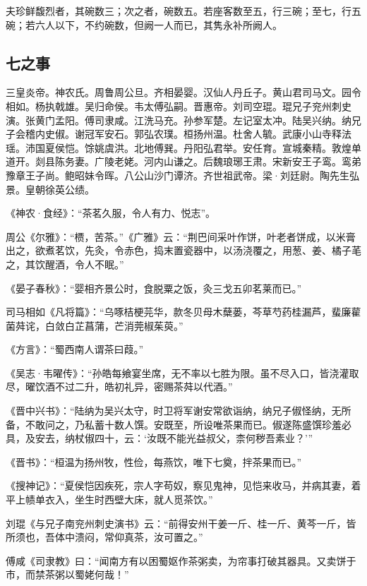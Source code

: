 \documentclass[]{article}
\begin{document}
夫珍鲜馥烈者，其碗数三；次之者，碗数五。若座客数至五，行三碗；至七，行五碗；若六人以下，不约碗数，但阙一人而已，其隽永补所阙人。

\hypertarget{header-n28}{%
\subsection{七之事}\label{header-n28}}

三皇炎帝。神农氏。周鲁周公旦。齐相晏婴。汉仙人丹丘子。黄山君司马文。园令相如。杨执戟雄。吴归命侯。韦太傅弘嗣。晋惠帝。刘司空琨。琨兄子兖州刺史演。张黄门孟阳。傅司隶咸。江洗马充。孙参军楚。左记室太冲。陆吴兴纳。纳兄子会稽内史俶。谢冠军安石。郭弘农璞。桓扬州温。杜舍人毓。武康小山寺释法瑶。沛国夏侯恺。馀姚虞洪。北地傅巽。丹阳弘君举。安任育。宣城秦精。敦煌单道开。剡县陈务妻。广陵老姥。河内山谦之。后魏琅琊王肃。宋新安王子鸾。鸾弟豫章王子尚。鲍昭妹令晖。八公山沙门谭济。齐世祖武帝。梁·刘廷尉。陶先生弘景。皇朝徐英公绩。

《神农·食经》：``茶茗久服，令人有力、悦志''。

周公《尔雅》：``槚，苦茶。''《广雅》云：``荆巴间采叶作饼，叶老者饼成，以米膏出之，欲煮茗饮，先灸，令赤色，捣末置瓷器中，以汤浇覆之，用葱、姜、橘子芼之，其饮醒酒，令人不眠。''

《晏子春秋》：``婴相齐景公时，食脱粟之饭，灸三戈五卯茗莱而已。''

司马相如《凡将篇》：``乌啄桔梗芫华，款冬贝母木蘖蒌，芩草芍药桂漏芦，蜚廉雚菌荈诧，白敛白芷菖蒲，芒消莞椒茱萸。''

《方言》：``蜀西南人谓茶曰葭。''

《吴志·韦曜传》：``孙皓每飨宴坐席，无不率以七胜为限。虽不尽入口，皆浇灌取尽，曜饮酒不过二升，皓初礼异，密赐茶荈以代酒。''

《晋中兴书》：``陆纳为吴兴太守，时卫将军谢安常欲诣纳，纳兄子俶怪纳，无所备，不敢问之，乃私蓄十数人馔。安既至，所设唯茶果而已。俶遂陈盛馔珍羞必具，及安去，纳杖俶四十，云：`汝既不能光益叔父，柰何秽吾素业？'''

《晋书》：``桓温为扬州牧，性俭，每燕饮，唯下七奠，拌茶果而已。''

《搜神记》：``夏侯恺因疾死，宗人字苟奴，察见鬼神，见恺来收马，并病其妻，着平上帻单衣入，坐生时西壁大床，就人觅茶饮。''

刘琨《与兄子南兖州刺史演书》云：``前得安州干姜一斤、桂一斤、黄芩一斤，皆所须也，吾体中溃闷，常仰真茶，汝可置之。''

傅咸《司隶教》曰：``闻南方有以困蜀妪作茶粥卖，为帘事打破其器具。又卖饼于市，而禁茶粥以蜀姥何哉！''
\end{document}
